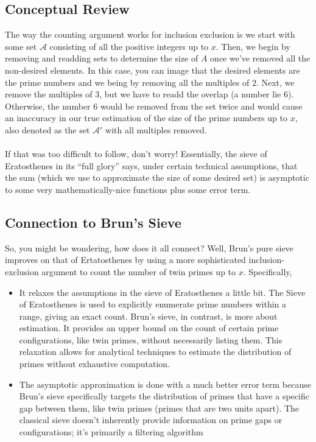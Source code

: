 \documentclass[8pt]{extarticle}
\begin{document}
\subsection{Conceptual Review}
The way the counting argument works for inclusion exclusion is we start with some set $\mathcal{A}$ consisting of all the positive integers up to $x$. Then, we begin by removing and readding sets to determine the size of $A$ once we've removed all the non-desired elements. In this case, you can image that the desired elements are the prime numbers and we being by removing all the multiples of $2$. Next, we remove the multiples of $3$, but we have to readd the overlap (a number lie $6$). Otherwise, the number $6$ would be removed from the set twice and would cause an inaccuracy in our true estimation of the size of the prime numbers up to $x$, also denoted as the set $\mathcal{A}'$ with all multiples removed.\\
\\
If that was too difficult to follow, don't worry! Essentially, the sieve of Eratosthenes in its ``full glory'' says, under certain technical assumptions, that the sum (which we use to approximate the size of some desired set) is asymptotic to some very mathematically-nice functions plus some error term.
\subsection{Connection to Brun's Sieve}
So, you might be wondering, how does it all connect? Well, Brun's pure sieve improves on that of Ertatosthenes by using a more sophisticated inclusion-exclusion argument to count the number of twin primes up to $x$. Specifically,
\begin{itemize}
    \item It relaxes the assumptions in the sieve of Eratosthenes a little bit. The Sieve of Eratosthenes is used to explicitly enumerate prime numbers within a range, giving an exact count. Brun's sieve, in contrast, is more about estimation. It provides an upper bound on the count of certain prime configurations, like twin primes, without necessarily listing them. This relaxation allows for analytical techniques to estimate the distribution of primes without exhaustive computation.
    \item The asymptotic approximation is done with a much better error term because Brun's sieve specifically targets the distribution of primes that have a specific gap between them, like twin primes (primes that are two units apart). The classical sieve doesn't inherently provide information on prime gaps or configurations; it's primarily a filtering algorithm
\end{itemize}
\pagebreak
\end{document}
